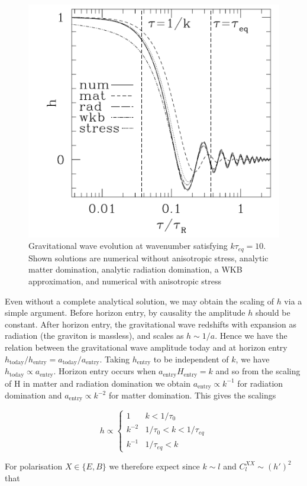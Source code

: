 \documentclass[a4paper,10pt]{article}
\begin{document}
\begin{figure}[h]
  \includegraphics[width=0.5\linewidth]{gravwaveev.png}
  \centering
  \caption{Gravitational wave evolution at wavenumber satisfying $k\tau_{eq}=10$. Shown solutions are numerical without anisotropic stress, analytic matter domination, analytic radiation domination, a WKB approximation, and numerical with anisotropic stress}
  \label{gravwave}
\end{figure}

Even without a complete analytical solution, we may obtain the scaling of $h$ via a simple argument. Before horizon entry,  by causality the amplitude $h$ should be constant. After horizon entry, the gravitational wave redshifts with expansion as radiation (the graviton is massless), and scales as $h\sim 1/a$. Hence we have the relation between the gravitational wave amplitude today and at horizon entry $h_{\text{today}}/h_{\text{entry}} = a_{\text{today}}/a_{\text{entry}}$. Taking $h_{\text{entry}}$ to be independent of $k$, we have $h_{\text{today}}\propto a_{\text{entry}}$. Horizon entry occurs when $a_{\text{entry}}H_{\text{entry}}=k$ and so from the scaling of H in matter and radiation domination we obtain $a_{\text{entry}}\propto k^{-1}$ for radiation domination and $a_{\text{entry}}\propto k^{-2}$ for matter domination. This gives the scalings

\begin{equation}
  h \propto
    \begin{cases}
      1 & k<1/\tau_0\\
      k^{-2} & 1/\tau_0<k<1/\tau_{eq}\\
      k^{-1} & 1/\tau_{eq}<k
    \end{cases}       
\end{equation}

For polarisation $X\in\{E,B\}$ we therefore expect since $k\sim l$ and $C_l^{XX}\sim (h')^2$ that
\end{document}
